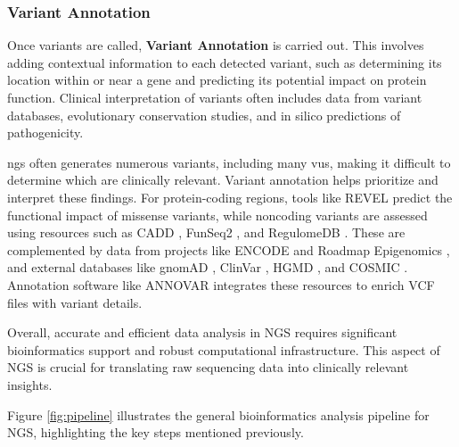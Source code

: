 \subsubsection{\textbf{Variant Annotation}} \label{subsubsec:ngs_annotation}
Once variants are called, \textbf{Variant Annotation} is carried out. This involves adding contextual information to each detected variant, such as determining its location within or near a gene and predicting its potential impact on protein function. Clinical interpretation of variants often includes data from variant databases, evolutionary conservation studies, and in silico predictions of pathogenicity. \cite{Rehm2013} 

\ac{ngs} often generates numerous variants, including many \ac{vus}, making it difficult to determine which are clinically relevant. Variant annotation helps prioritize and interpret these findings. For protein-coding regions, tools like REVEL \cite{REVEL} predict the functional impact of missense variants, while noncoding variants are assessed using resources such as CADD \cite{CADD}, FunSeq2 \cite{FunSeq2}, and RegulomeDB \cite{RegulomeDB}. These are complemented by data from projects like ENCODE \cite{ENCODE} and Roadmap Epigenomics \cite{REC}, and external databases like gnomAD \cite{gnomAD}, ClinVar \cite{ClinVar}, HGMD \cite{HGMD}, and COSMIC \cite{COSMIC}. Annotation software like ANNOVAR \cite{ANNOVAR} integrates these resources to enrich VCF files with variant details. \cite{Larson2023}

Overall, accurate and efficient data analysis in NGS requires significant bioinformatics support and robust computational infrastructure. This aspect of NGS is crucial for translating raw sequencing data into clinically relevant insights.

Figure \ref{fig:pipeline} illustrates the general bioinformatics analysis pipeline for NGS, highlighting the key steps mentioned previously.


